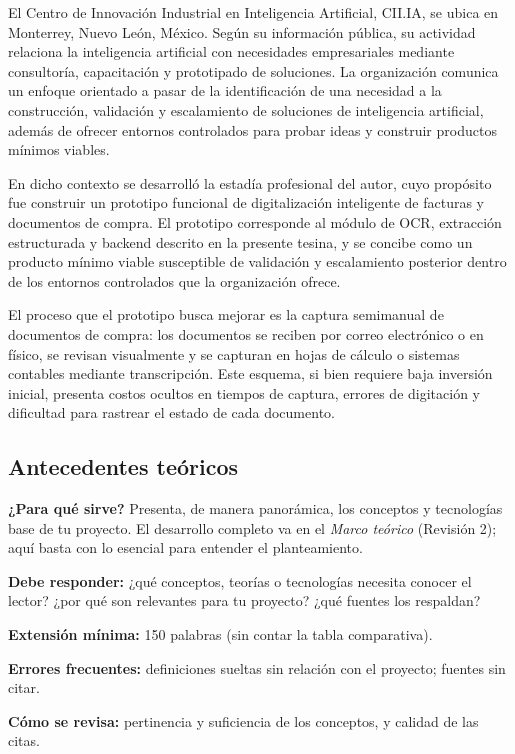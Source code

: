 El Centro de Innovación Industrial en Inteligencia Artificial, CII.IA, se ubica en Monterrey, Nuevo León, México. Según su información pública, su actividad relaciona la inteligencia artificial con necesidades empresariales mediante consultoría, capacitación y prototipado de soluciones\cite{ciiia_2026a}. La organización comunica un enfoque orientado a pasar de la identificación de una necesidad a la construcción, validación y escalamiento de soluciones de inteligencia artificial, además de ofrecer entornos controlados para probar ideas y construir productos mínimos viables\cite{ciiia_2026b}.

En dicho contexto se desarrolló la estadía profesional del autor, cuyo propósito fue construir un prototipo funcional de digitalización inteligente de facturas y documentos de compra. El prototipo corresponde al módulo de OCR, extracción estructurada y backend descrito en la presente tesina, y se concibe como un producto mínimo viable susceptible de validación y escalamiento posterior dentro de los entornos controlados que la organización ofrece\cite{ciiia_2026b}.

El proceso que el prototipo busca mejorar es la captura semimanual de documentos de compra: los documentos se reciben por correo electrónico o en físico, se revisan visualmente y se capturan en hojas de cálculo o sistemas contables mediante transcripción. Este esquema, si bien requiere baja inversión inicial, presenta costos ocultos en tiempos de captura, errores de digitación y dificultad para rastrear el estado de cada documento\cite{manual_entry_errors_2023}.


\subsection{Antecedentes teóricos} \label{sec:antecedentes_teoricos} %

\begin{guia}
\textbf{¿Para qué sirve?} Presenta, de manera panorámica, los conceptos y tecnologías base de tu proyecto. El desarrollo
completo va en el \emph{Marco teórico} (Revisión 2); aquí basta con lo esencial para entender el planteamiento.

\textbf{Debe responder:} ¿qué conceptos, teorías o tecnologías necesita conocer el lector? ¿por qué son relevantes para
tu proyecto? ¿qué fuentes los respaldan?

\textbf{Extensión mínima:} 150 palabras (sin contar la tabla comparativa).

\textbf{Errores frecuentes:} definiciones sueltas sin relación con el proyecto; fuentes sin citar.

\textbf{Cómo se revisa:} pertinencia y suficiencia de los conceptos, y calidad de las citas.
\end{guia}

